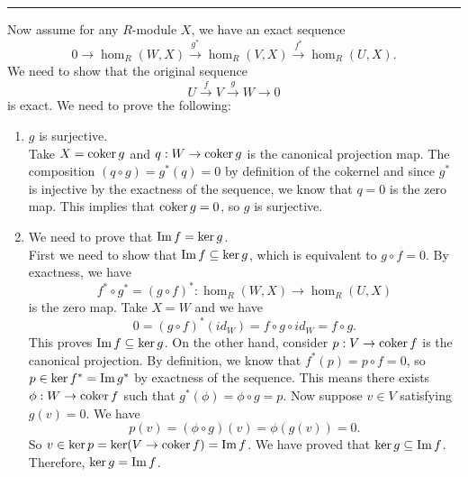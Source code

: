 \documentclass[a4paper, 12pt]{article}
\begin{document}
\begin{solution}
\begin{enumerate}[(1)]
\end{enumerate} 
\noindent\rule{7in}{1.5pt}
Now assume for any \(R\)-module \(X\), we have an exact sequence
\[0\rightarrow \hom_R(W,X)\xrightarrow{g^*}\hom_R(V,X)\xrightarrow{f^*}\hom_R(U,X).\]
We need to show that the original sequence
\[U\xrightarrow{f}V\xrightarrow{g}W\rightarrow 0\]
is exact. We need to prove the following:
\begin{enumerate}[(1)]
\item \(g\) is surjective.\\ 
Take \(X=\text{coker}\, g\) and \(q:W\rightarrow \text{coker}\, g\) is the canonical projection map. The composition \((q\circ g)=g^*(q)=0\) by definition of the cokernel and since \(g^*\) is injective by the exactness of the sequence, we know that \(q=0\) is the 
zero map. This implies that \(\text{coker}\, g=0\), so \(g\) is surjective.
\item We need to prove that \(\text{Im}\, f=\ker g\).\\ 
First we need to show that \(\text{Im}\, f\subseteq \ker g\), which is equivalent to \(g\circ f=0\). By exactness, we have 
\[f^*\circ g^*=(g\circ f)^*:\hom _R(W,X)\rightarrow \hom_R(U,X)\]
is the zero map. Take \(X=W\) and we have 
\[0=(g\circ f)^*(id_W)=f\circ g\circ id_W=f\circ g.\]
This proves \(\text{Im}\, f\subseteq \ker g\). On the other hand, consider \(p:V\rightarrow \text{coker}\, f\) is the canonical projection. By definition, we know that \(f^*(p)=p\circ f=0\), so \(p\in \ker f^*=\text{Im}\, g^*\) by exactness of 
the sequence. This means there exists \(\phi:W\rightarrow \text{coker}\, f\) such that \(g^*(\phi)=\phi\circ g=p\). Now suppose \(v\in V\) satisfying \(g(v)=0\). We have 
\[p(v)=(\phi\circ g)(v)=\phi(g(v))=0.\]
So \(v\in \ker p=\ker(V\rightarrow \text{coker}\, f)=\text{Im}\, f\). We have proved that \(\ker g\subseteq \text{Im}\, f\). Therefore, \(\ker g=\text{Im}\, f\).
\end{enumerate}
\end{solution}
\end{document}
